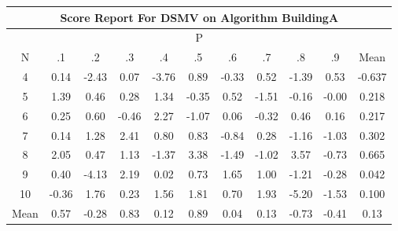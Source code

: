 \documentclass[11pt,a4paper]{report}
\begin{document}
\begin{longtable}{ | c || c | c | c | c | c | c | c | c | c || c |}
\hline
\multicolumn{11}{|c|}{ Score Report For DSMV on Algorithm BuildingA} \\
\hline
\multicolumn{11}{|c|}{ P } \\
\hline
N & .1 & .2 & .3 & .4 & .5 & .6 & .7 & .8 & .9 & Mean\\
 \hline
 \hline
 \endhead
  4 &  \cellcolor[HTML]{FFFFFF} 0.14 &  \cellcolor[HTML]{FFBFBF} -2.43 &  \cellcolor[HTML]{FFFFFF} 0.07 &  \cellcolor[HTML]{FF9F9F} -3.76 &  \cellcolor[HTML]{E7E7FF} 0.89 &  \cellcolor[HTML]{FFF7F7} -0.33 &  \cellcolor[HTML]{EFEFFF} 0.52 &  \cellcolor[HTML]{FFDFDF} -1.39 &  \cellcolor[HTML]{EFEFFF} 0.53 & -0.637 \\
  5 &  \cellcolor[HTML]{DFDFFF} 1.39 &  \cellcolor[HTML]{F7F7FF} 0.46 &  \cellcolor[HTML]{F7F7FF} 0.28 &  \cellcolor[HTML]{DFDFFF} 1.34 &  \cellcolor[HTML]{FFF7F7} -0.35 &  \cellcolor[HTML]{EFEFFF} 0.52 &  \cellcolor[HTML]{FFD7D7} -1.51 &  \cellcolor[HTML]{FFF7F7} -0.16 &  \cellcolor[HTML]{FFFFFF} -0.00 & 0.218 \\
  6 &  \cellcolor[HTML]{F7F7FF} 0.25 &  \cellcolor[HTML]{EFEFFF} 0.60 &  \cellcolor[HTML]{FFF7F7} -0.46 &  \cellcolor[HTML]{C7C7FF} 2.27 &  \cellcolor[HTML]{FFE7E7} -1.07 &  \cellcolor[HTML]{FFFFFF} 0.06 &  \cellcolor[HTML]{FFF7F7} -0.32 &  \cellcolor[HTML]{F7F7FF} 0.46 &  \cellcolor[HTML]{F7F7FF} 0.16 & 0.217 \\
  7 &  \cellcolor[HTML]{FFFFFF} 0.14 &  \cellcolor[HTML]{DFDFFF} 1.28 &  \cellcolor[HTML]{BFBFFF} 2.41 &  \cellcolor[HTML]{E7E7FF} 0.80 &  \cellcolor[HTML]{E7E7FF} 0.83 &  \cellcolor[HTML]{FFE7E7} -0.84 &  \cellcolor[HTML]{F7F7FF} 0.28 &  \cellcolor[HTML]{FFDFDF} -1.16 &  \cellcolor[HTML]{FFE7E7} -1.03 & 0.302 \\
  8 &  \cellcolor[HTML]{CFCFFF} 2.05 &  \cellcolor[HTML]{F7F7FF} 0.47 &  \cellcolor[HTML]{DFDFFF} 1.13 &  \cellcolor[HTML]{FFDFDF} -1.37 &  \cellcolor[HTML]{A7A7FF} 3.38 &  \cellcolor[HTML]{FFD7D7} -1.49 &  \cellcolor[HTML]{FFE7E7} -1.02 &  \cellcolor[HTML]{A7A7FF} 3.57 &  \cellcolor[HTML]{FFEFEF} -0.73 & 0.665 \\
  9 &  \cellcolor[HTML]{F7F7FF} 0.40 &  \cellcolor[HTML]{FF9797} -4.13 &  \cellcolor[HTML]{C7C7FF} 2.19 &  \cellcolor[HTML]{FFFFFF} 0.02 &  \cellcolor[HTML]{EFEFFF} 0.73 &  \cellcolor[HTML]{D7D7FF} 1.65 &  \cellcolor[HTML]{E7E7FF} 1.00 &  \cellcolor[HTML]{FFDFDF} -1.21 &  \cellcolor[HTML]{FFF7F7} -0.28 & 0.042 \\
  10 &  \cellcolor[HTML]{FFF7F7} -0.36 &  \cellcolor[HTML]{CFCFFF} 1.76 &  \cellcolor[HTML]{F7F7FF} 0.23 &  \cellcolor[HTML]{D7D7FF} 1.56 &  \cellcolor[HTML]{CFCFFF} 1.81 &  \cellcolor[HTML]{EFEFFF} 0.70 &  \cellcolor[HTML]{CFCFFF} 1.93 &  \cellcolor[HTML]{FF8080} -5.20 &  \cellcolor[HTML]{FFD7D7} -1.53 & 0.100 \\
 \hline
 \hline
Mean &  \cellcolor[HTML]{EFEFFF} 0.57 &  \cellcolor[HTML]{FFF7F7} -0.28 &  \cellcolor[HTML]{E7E7FF} 0.83 &  \cellcolor[HTML]{FFFFFF} 0.12 &  \cellcolor[HTML]{E7E7FF} 0.89 &  \cellcolor[HTML]{FFFFFF} 0.04 &  \cellcolor[HTML]{FFFFFF} 0.13 &  \cellcolor[HTML]{FFEFEF} -0.73 &  \cellcolor[HTML]{FFF7F7} -0.41 &  \cellcolor[HTML]{FFFFFF} 0.13
\end{longtable}
\end{document}
